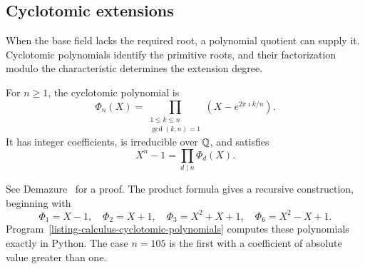 \subsection{Cyclotomic extensions}
\label{sect2-cyclotomic-field}

When the base field lacks the required root, a polynomial quotient can
supply it. Cyclotomic polynomials identify the primitive roots, and their
factorization modulo the characteristic determines the extension degree.

\begin{thmdefn}
\label{notation-64}
For $n\geq1$, the cyclotomic polynomial is
\[
 \Phi_n(X)=\prod_{\substack{1\leq k\leq n\\\gcd(k,n)=1}}
                 (X-e^{2\pi\imath k/n}).
\]
It has integer coefficients, is irreducible over $\mathbb{Q}$, and satisfies
\begin{equation}
\label{eq-decomposition-xn-1}
 X^n-1=\prod_{d\mid n}\Phi_d(X).
\end{equation}
\end{thmdefn}
See Demazure~\cite{demazure} for a proof. The product formula gives a
recursive construction, beginning with
\[
 \Phi_1=X-1,\quad \Phi_2=X+1,\quad
 \Phi_3=X^2+X+1,\quad \Phi_6=X^2-X+1.
\]
Program~\ref{listing-calculus-cyclotomic-polynomials} computes these
polynomials exactly in Python. The case $n=105$ is the first with a
coefficient of absolute value greater than one.
\begin{listing}[H]
\caption{An exact cyclotomic polynomial.}
\label{listing-calculus-cyclotomic-polynomials}
\end{listing}



